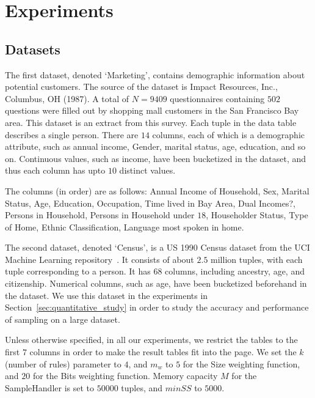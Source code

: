 
\section{Experiments}\label{sec:experiments}

\subsection{Datasets}
The first dataset, denoted `Marketing', contains demographic information about potential customers. The source of the dataset is Impact Resources, Inc., Columbus, OH (1987). A total of $N=9409$ questionnaires containing $502$ questions were 
filled out by shopping mall customers in the San Francisco Bay area. This dataset is an extract from this survey. Each tuple in the data table describes a single person. There are $14$ columns, each of which is a demographic attribute, such as annual income, Gender, marital status, age, education, and so on. Continuous values, such as income, have been bucketized in the dataset, and thus each column has upto $10$ distinct values. 

The columns (in order) are as follows:
Annual Income of Household, Sex, Marital Status, Age, Education, Occupation, Time lived in Bay Area, Dual Incomes?, Persons in Household, Persons in Household under $18$, Householder Status, Type of Home, Ethnic Classification, Language most spoken in home.

The second dataset, denoted `Census', is a US 1990 Census dataset from the UCI Machine Learning repository~\cite{uciml}. It consists of about $2.5$ million tuples, with each tuple corresponding to a person. It has $68$ columns, including ancestry, age, and citizenship. Numerical columns, such as age, have been bucketized beforehand in the dataset. We use this dataset in the experiments in Section~\ref{sec:quantitative_study} in order to study the accuracy and performance of sampling on a large dataset.

Unless otherwise specified, in all our experiments, we restrict the tables to the first $7$ columns in order to make the result tables fit into the page. We set the $k$ (number of rules) parameter to $4$, and $m_w$ to $5$ for the Size weighting function, and $20$ for the Bits weighting function. Memory capacity $M$ for the SampleHandler is set to $50000$ tuples, and $minSS$ to $5000$.

